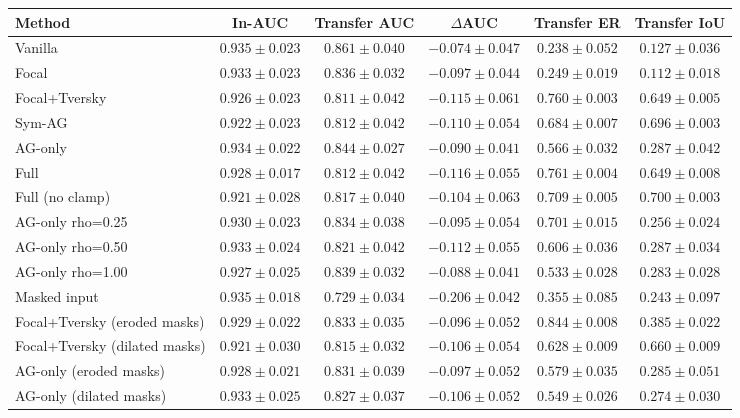 \begin{tabular}{l c c c c c}
\toprule
\textbf{Method} & \textbf{In-AUC} & \textbf{Transfer AUC} & \textbf{$\Delta$AUC} & \textbf{Transfer ER} & \textbf{Transfer IoU} \\
\midrule
Vanilla & $0.935 \pm 0.023$ & $0.861 \pm 0.040$ & $-0.074 \pm 0.047$ & $0.238 \pm 0.052$ & $0.127 \pm 0.036$ \\
Focal & $0.933 \pm 0.023$ & $0.836 \pm 0.032$ & $-0.097 \pm 0.044$ & $0.249 \pm 0.019$ & $0.112 \pm 0.018$ \\
Focal+Tversky & $0.926 \pm 0.023$ & $0.811 \pm 0.042$ & $-0.115 \pm 0.061$ & $0.760 \pm 0.003$ & $0.649 \pm 0.005$ \\
Sym-AG & $0.922 \pm 0.023$ & $0.812 \pm 0.042$ & $-0.110 \pm 0.054$ & $0.684 \pm 0.007$ & $0.696 \pm 0.003$ \\
AG-only & $0.934 \pm 0.022$ & $0.844 \pm 0.027$ & $-0.090 \pm 0.041$ & $0.566 \pm 0.032$ & $0.287 \pm 0.042$ \\
Full & $0.928 \pm 0.017$ & $0.812 \pm 0.042$ & $-0.116 \pm 0.055$ & $0.761 \pm 0.004$ & $0.649 \pm 0.008$ \\
Full (no clamp) & $0.921 \pm 0.028$ & $0.817 \pm 0.040$ & $-0.104 \pm 0.063$ & $0.709 \pm 0.005$ & $0.700 \pm 0.003$ \\
AG-only rho=0.25 & $0.930 \pm 0.023$ & $0.834 \pm 0.038$ & $-0.095 \pm 0.054$ & $0.701 \pm 0.015$ & $0.256 \pm 0.024$ \\
AG-only rho=0.50 & $0.933 \pm 0.024$ & $0.821 \pm 0.042$ & $-0.112 \pm 0.055$ & $0.606 \pm 0.036$ & $0.287 \pm 0.034$ \\
AG-only rho=1.00 & $0.927 \pm 0.025$ & $0.839 \pm 0.032$ & $-0.088 \pm 0.041$ & $0.533 \pm 0.028$ & $0.283 \pm 0.028$ \\
Masked input & $0.935 \pm 0.018$ & $0.729 \pm 0.034$ & $-0.206 \pm 0.042$ & $0.355 \pm 0.085$ & $0.243 \pm 0.097$ \\
Focal+Tversky (eroded masks) & $0.929 \pm 0.022$ & $0.833 \pm 0.035$ & $-0.096 \pm 0.052$ & $0.844 \pm 0.008$ & $0.385 \pm 0.022$ \\
Focal+Tversky (dilated masks) & $0.921 \pm 0.030$ & $0.815 \pm 0.032$ & $-0.106 \pm 0.054$ & $0.628 \pm 0.009$ & $0.660 \pm 0.009$ \\
AG-only (eroded masks) & $0.928 \pm 0.021$ & $0.831 \pm 0.039$ & $-0.097 \pm 0.052$ & $0.579 \pm 0.035$ & $0.285 \pm 0.051$ \\
AG-only (dilated masks) & $0.933 \pm 0.025$ & $0.827 \pm 0.037$ & $-0.106 \pm 0.052$ & $0.549 \pm 0.026$ & $0.274 \pm 0.030$ \\
\bottomrule
\end{tabular}

